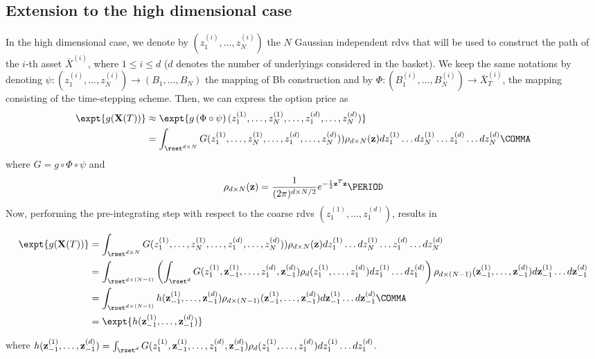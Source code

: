 \subsection{Extension to the high dimensional case}
In the high dimensional case, we denote by $(z_1^{(i)},\dots,z_N^{(i)})$ the $N$ Gaussian independent rdvs that will be used to construct the path of the $i$-th asset $\bar{X}^{(i)}$, where $1 \le i \le d$ ($d$ denotes the number of underlyings considered in the basket). We keep the  same notations by denoting  $\psi: (z_1^{(i)},\dots,z_N^{(i)}) \rightarrow (B_1,\dots,B_N)$ the mapping of Bb construction and by $\Phi: (B^{(i)}_1,\dots,B^{(i)}_N) \rightarrow \bar{X}^{(i)}_T$, the mapping consisting of the time-stepping scheme. Then, we can express the option price as
\begin{align}\label{eq: option price as integral_basket}
	\expt{g(\mathbf{X}(T))}&\approx	\expt{g\left(\Phi \circ \psi \right) (z_1^{(1)}, \dots, z_N^{(1)}, \dots, z_1^{(d)},\dots,z^{(d)}_N)} \nonumber\\
	&=\int_{\rset^{d \times N}} G(z_1^{(1)}, \dots, z_N^{(1)}, \dots, z_1^{(d)},\dots,z^{(d)}_N)) \rho_{d \times N}(\mathbf{z}) dz_1^{(1)} \dots dz_N^{(1)} \dots z_1^{(d)} \dots dz^{(d)}_N \COMMA
\end{align}
where $G=g \circ \Phi \circ \psi$ and
\begin{equation*}
\rho_{d \times N}(\mathbf{z})=\frac{1}{(2 \pi)^{{d \times N}/2}} e^{-\frac{1}{2} \mathbf{z}^T \mathbf{z}} \PERIOD
\end{equation*}
Now,  performing the  pre-integrating step with respect to the coarse rdvs $(z_1^{(1)},\dots, z_1^{(d)} )$, results in
\begin{small}
\begin{align}\label{eq: pre_integration_step_wrt_y1_basket}
	\expt{g(\mathbf{X}(T))}&=\int_{\rset^{d \times N}} G(z_1^{(1)}, \dots, z_N^{(1)}, \dots, z_1^{(d)},\dots,z^{(d)}_N)) \rho_{d \times N}(\mathbf{z}) dz_1^{(1)} \dots dz_N^{(1)} \dots z_1^{(d)} \dots dz^{(d)}_N \nonumber\\ 
	&=\int_{\rset^{d \times (N-1)}} \left(\int_{\rset^d} G(z^{(1)}_1,\mathbf{z}^{(1)}_{-1},\dots,z^{(d)}_1,\mathbf{z}^{(d)}_{-1} ) \rho_d(z_1^{(1)},\dots,z_1^{(d)}) dz_1^{(1)}\dots dz_1^{(d)}  \right) \rho_{d \times(N-1)}(\mathbf{z}_{-1}^{(1)},\dots,\mathbf{z}_{-1}^{(d)}) d\mathbf{z}_{-1}^{(1)}\dots d\mathbf{z}_{-1}^{(d)}\nonumber\\	
	&=\int_{\rset^{d\times (N-1)}} h(\mathbf{z}^{(1)}_{-1},\dots,\mathbf{z}^{(d)}_{-1} ) \rho_{d\times (N-1)}(\mathbf{z}_{-1}^{(1)},\dots,\mathbf{z}_{-1}^{(d)}) d\mathbf{z}^{(1)}_{-1} \dots d\mathbf{z}^{(d)}_{-1}\COMMA \\ \nonumber
	&=\expt{h(\mathbf{z}^{(1)}_{-1},\dots,\mathbf{z}^{(d)}_{-1} )}
\end{align}
\end{small}
where $h(\mathbf{z}^{(1)}_{-1},\dots,\mathbf{z}^{(d)}_{-1})=\int_{\rset^d} G(z^{(1)}_1,\mathbf{z}^{(1)}_{-1},\dots,z^{(d)}_1,\mathbf{z}^{(d)}_{-1} )   \rho_d(z_1^{(1)},\dots,z_1^{(d)}) dz_1^{(1)}\dots dz_1^{(d)}$.


